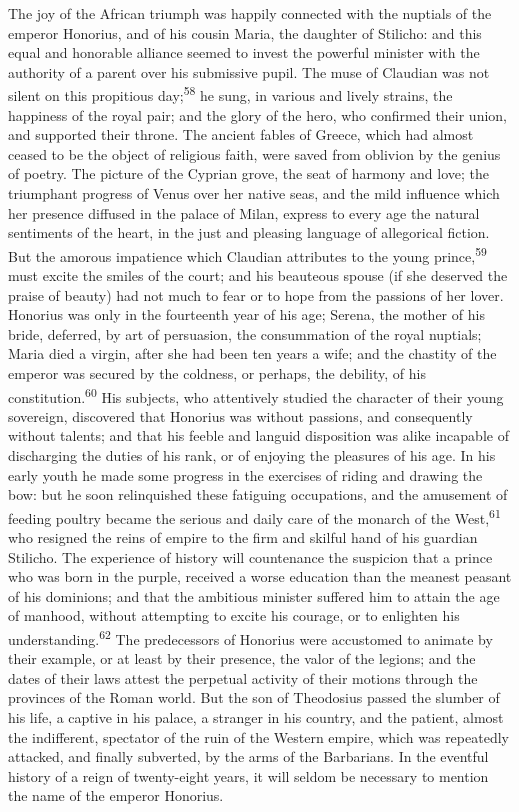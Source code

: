 The joy of the African triumph was happily connected with the
nuptials of the emperor Honorius, and of his cousin Maria, the
daughter of Stilicho: and this equal and honorable alliance
seemed to invest the powerful minister with the authority of a
parent over his submissive pupil. The muse of Claudian was not
silent on this propitious day;\textsuperscript{58} he sung, in various and lively
strains, the happiness of the royal pair; and the glory of the
hero, who confirmed their union, and supported their throne. The
ancient fables of Greece, which had almost ceased to be the
object of religious faith, were saved from oblivion by the genius
of poetry. The picture of the Cyprian grove, the seat of harmony
and love; the triumphant progress of Venus over her native seas,
and the mild influence which her presence diffused in the palace
of Milan, express to every age the natural sentiments of the
heart, in the just and pleasing language of allegorical fiction.
But the amorous impatience which Claudian attributes to the young
prince,\textsuperscript{59} must excite the smiles of the court; and his beauteous
spouse (if she deserved the praise of beauty) had not much to
fear or to hope from the passions of her lover. Honorius was only
in the fourteenth year of his age; Serena, the mother of his
bride, deferred, by art of persuasion, the consummation of the
royal nuptials; Maria died a virgin, after she had been ten years
a wife; and the chastity of the emperor was secured by the
coldness, or perhaps, the debility, of his constitution.\textsuperscript{60} His
subjects, who attentively studied the character of their young
sovereign, discovered that Honorius was without passions, and
consequently without talents; and that his feeble and languid
disposition was alike incapable of discharging the duties of his
rank, or of enjoying the pleasures of his age. In his early youth
he made some progress in the exercises of riding and drawing the
bow: but he soon relinquished these fatiguing occupations, and
the amusement of feeding poultry became the serious and daily
care of the monarch of the West,\textsuperscript{61} who resigned the reins of
empire to the firm and skilful hand of his guardian Stilicho. The
experience of history will countenance the suspicion that a
prince who was born in the purple, received a worse education
than the meanest peasant of his dominions; and that the ambitious
minister suffered him to attain the age of manhood, without
attempting to excite his courage, or to enlighten his
understanding.\textsuperscript{62} The predecessors of Honorius were accustomed to
animate by their example, or at least by their presence, the
valor of the legions; and the dates of their laws attest the
perpetual activity of their motions through the provinces of the
Roman world. But the son of Theodosius passed the slumber of his
life, a captive in his palace, a stranger in his country, and the
patient, almost the indifferent, spectator of the ruin of the
Western empire, which was repeatedly attacked, and finally
subverted, by the arms of the Barbarians. In the eventful history
of a reign of twenty-eight years, it will seldom be necessary to
mention the name of the emperor Honorius.

